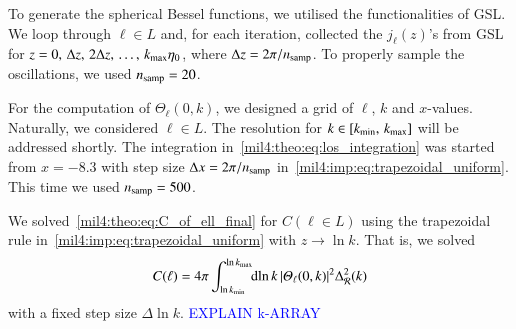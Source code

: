 To generate the spherical Bessel functions, we utilised the functionalities of GSL. We loop through $\ell \in L$ and, for each iteration, collected the $j_\ell(z)$'s from GSL for $z=0,\,\Delta z,\, 2\Delta z,\, \dots,\, k_\mathrm{max}\eta_0$, where $\Delta z = 2\pi/n_\mathrm{samp}$. To properly sample the oscillations, we used $n_\mathrm{samp}=20$. 

For the computation of $\Theta_\ell(0,k)$, we designed a grid of $\ell$, $k$ and $x$-values. Naturally, we considered $\ell \in L$. The resolution for $k\in [k_\mathrm{min},\,k_\mathrm{max}]$ will be addressed shortly. The integration in~\cref{mil4:theo:eq:los_integration} was started from $x=-8.3$ with step size $\Delta x= 2\pi/n_\mathrm{samp}$ in~\cref{mil4:imp:eq:trapezoidal_uniform}. This time we used $n_\mathrm{samp}=500$. 

We solved~\cref{mil4:theo:eq:C_of_ell_final} for $C(\ell\in L)$ using the trapezoidal rule in~\cref{mil4:imp:eq:trapezoidal_uniform} with $z\to\ln{k}$. That is, we solved
\begin{equation}
    C(\ell) = 4\pi \int_{\ln{k\ensuremath{_\mathrm{min}}}}^{\ln{k\ensuremath{_\mathrm{max}}}} \!\!\mathop{}\!\mathrm{d} {\ln{k}}\, \abs{\varTheta_\ell(0,k)}^2 \Delta_\mathcal{R}^2(k)
\end{equation}
with a fixed step size $\Delta\!\ln{k}$. \textcolor{blue}{EXPLAIN k-ARRAY}